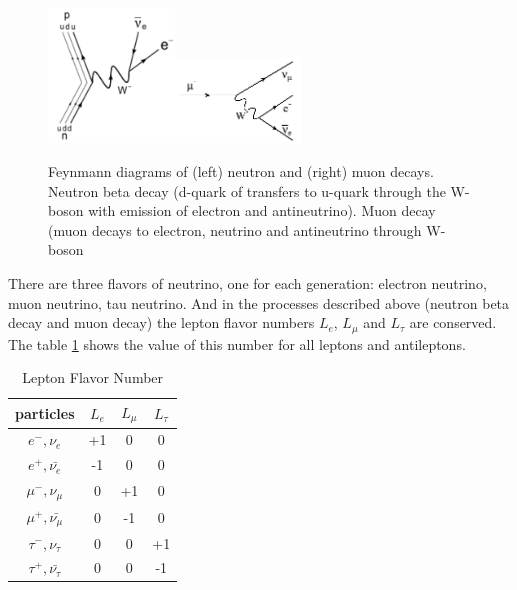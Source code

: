 \begin{figure}
\caption{Feynmann diagrams of (left) neutron and (right) muon decays. Neutron beta decay \cite{ref_fig_NeutronDecay}(d-quark of transfers to u-quark through the W-boson with emission of electron and antineutrino). Muon decay \cite{ref_fig_MuonDecay}(muon decays to electron, neutrino and antineutrino through W-boson}
\label{fig:MuonAndNeutronDecays}
\centering
\includegraphics[width=0.3\textwidth, keepaspectratio=true]{figs/NeutronBetaDecay.png}\includegraphics[width=0.3\textwidth, keepaspectratio=true]{figs/MuonDecay.png}
\end{figure}

There are three flavors of neutrino, one for each generation: electron neutrino, muon neutrino, tau neutrino. And in the processes described above (neutron beta decay and muon decay) the lepton flavor numbers $L_e$, $L_{\mu}$ and $L_{\tau}$ are conserved. The table \ref{tab:LeptonFlavorNumber} shows the value of this number for all leptons and antileptons. 

\begin{table}[h]
  \begin{center}
  \caption{ Lepton Flavor Number}
  \begin{tabular}{|c|c|c|c|}
     particles & $L_e$ & $L_{\mu}$ & $L_{\tau}$ \\ \hline
     $e^-,\nu_e$ &  +1  &  0  &  0  \\ \hline 
     $e^+, \bar{\nu_e}$ &  -1  &  0  &  0  \\ \hline 
     $\mu^-,\nu_{\mu}$ &  0  &  +1  &  0  \\ \hline 
     $\mu^+, \bar{\nu_{\mu}}$ &  0  &  -1  &  0  \\ \hline 
     $\tau^-,\nu_{\tau}$ &  0  &  0  &  +1  \\ \hline 
     $\tau^+, \bar{\nu_{\tau}}$ &  0  &  0  &  -1  \\ \hline 
  \end{tabular}
  \label{tab:LeptonFlavorNumber}
  \end{center}
\end{table}


